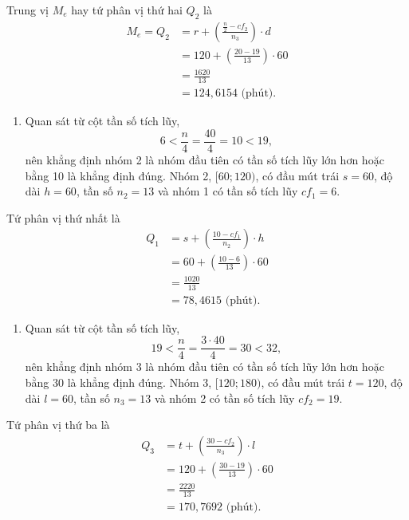 \documentclass[
  letterpaper,
  DIV=11,
  numbers=noendperiod]{scrartcl}
\providecommand{\tightlist}{%
  \setlength{\itemsep}{0pt}\setlength{\parskip}{0pt}}\usepackage{longtable,booktabs,array}
\begin{document}
Trung vị \(M_e\) hay tứ phân vị thứ hai \(Q_2\) là \begin{align*}
    M_e = Q_2
        & = r + \left( \frac{\frac{n}{2} - cf_2}{n_3}\right)\cdot d \\
        & = 120 + \left( \frac{20-19}{13}\right)\cdot 60 \\
        & = \frac{1620}{13} \\
        & = 124,6154 \text{ (phút).}
\end{align*}

\begin{enumerate}
\def\labelenumi{\alph{enumi}.}
\setcounter{enumi}{1}
\tightlist
\item
  Quan sát từ cột tần số tích lũy, \[
   6 < \frac{n}{4} = \frac{40}{4} = 10 < 19,
  \] nên khẳng định nhóm 2 là nhóm đầu tiên có tần số tích lũy lớn hơn
  hoặc bằng 10 là khẳng định đúng. Nhóm 2, \([60; 120)\), có đầu mút
  trái \(s=60\), độ dài \(h=60\), tần số \(n_2=13\) và nhóm 1 có tần số
  tích lũy \(cf_1 = 6\).
\end{enumerate}

Tứ phân vị thứ nhất là \begin{align*}
    Q_1 
        & = s + \left (\frac{10-cf_1}{n_2}\right)\cdot h \\
        & = 60 + \left(\frac{10-6}{13}\right)\cdot 60 \\
        & = \frac{1020}{13} \\
        & = 78,4615 \text{ (phút).}
\end{align*}

\begin{enumerate}
\def\labelenumi{\alph{enumi}.}
\setcounter{enumi}{2}
\tightlist
\item
  Quan sát từ cột tần số tích lũy, \[
   19 < \frac{n}{4} = \frac{3\cdot 40}{4} = 30 < 32,
  \] nên khẳng định nhóm 3 là nhóm đầu tiên có tần số tích lũy lớn hơn
  hoặc bằng 30 là khẳng định đúng. Nhóm 3, \([120;180)\), có đầu mút
  trái \(t=120\), độ dài \(l=60\), tần số \(n_3=13\) và nhóm 2 có tần số
  tích lũy \(cf_2 = 19\).
\end{enumerate}

Tứ phân vị thứ ba là \begin{align*}
    Q_3 
        & = t + \left (\frac{30-cf_2}{n_3}\right)\cdot l \\
        & = 120 + \left(\frac{30-19}{13}\right)\cdot 60 \\
        & = \frac{2220}{13} \\
        & = 170,7692 \text{ (phút).}
\end{align*}
\end{document}
